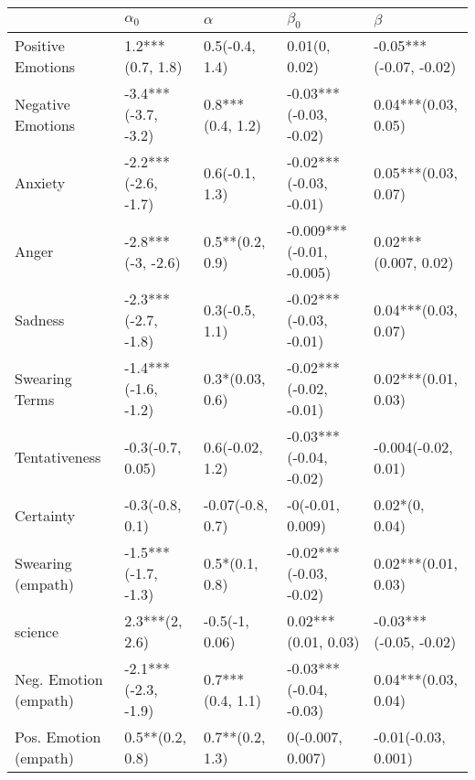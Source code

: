 \begin{tabular}{lllll}
\toprule
{} &           $\alpha_0$ &          $\alpha$ &                 $\beta_0$ &                 $\beta$ \\
\midrule
Positive Emotions     &     1.2***(0.7, 1.8) &    0.5(-0.4, 1.4) &             0.01(0, 0.02) &  -0.05***(-0.07, -0.02) \\
Negative Emotions     &  -3.4***(-3.7, -3.2) &  0.8***(0.4, 1.2) &    -0.03***(-0.03, -0.02) &     0.04***(0.03, 0.05) \\
Anxiety               &  -2.2***(-2.6, -1.7) &    0.6(-0.1, 1.3) &    -0.02***(-0.03, -0.01) &     0.05***(0.03, 0.07) \\
Anger                 &    -2.8***(-3, -2.6) &   0.5**(0.2, 0.9) &  -0.009***(-0.01, -0.005) &    0.02***(0.007, 0.02) \\
Sadness               &  -2.3***(-2.7, -1.8) &    0.3(-0.5, 1.1) &    -0.02***(-0.03, -0.01) &     0.04***(0.03, 0.07) \\
Swearing Terms        &  -1.4***(-1.6, -1.2) &   0.3*(0.03, 0.6) &    -0.02***(-0.02, -0.01) &     0.02***(0.01, 0.03) \\
Tentativeness         &     -0.3(-0.7, 0.05) &   0.6(-0.02, 1.2) &    -0.03***(-0.04, -0.02) &     -0.004(-0.02, 0.01) \\
Certainty             &      -0.3(-0.8, 0.1) &  -0.07(-0.8, 0.7) &          -0(-0.01, 0.009) &          0.02*(0, 0.04) \\
Swearing (empath)     &  -1.5***(-1.7, -1.3) &    0.5*(0.1, 0.8) &    -0.02***(-0.03, -0.02) &     0.02***(0.01, 0.03) \\
science               &       2.3***(2, 2.6) &    -0.5(-1, 0.06) &       0.02***(0.01, 0.03) &  -0.03***(-0.05, -0.02) \\
Neg. Emotion (empath) &  -2.1***(-2.3, -1.9) &  0.7***(0.4, 1.1) &    -0.03***(-0.04, -0.03) &     0.04***(0.03, 0.04) \\
Pos. Emotion (empath) &      0.5**(0.2, 0.8) &   0.7**(0.2, 1.3) &          0(-0.007, 0.007) &     -0.01(-0.03, 0.001) \\
\bottomrule
\end{tabular}
